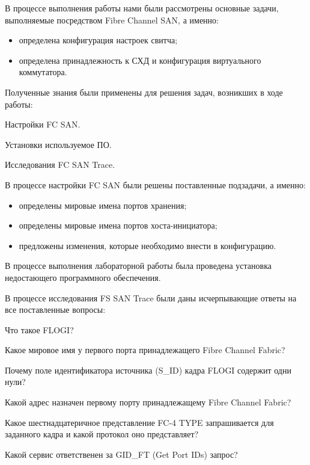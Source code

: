 
В процессе выполнения работы нами были рассмотрены основные задачи, выполняемые
посредством Fibre Channel SAN, а именно:

\begin{itemize}
    \item определена конфигурация настроек свитча;
    \item определена принадлежность к СХД и конфигурация виртуального
          коммутатора.
\end{itemize}

Полученные знания были применены для решения задач, возникших в ходе работы:

\begin{enumerate_num}
    \item Настройки FC SAN.
    \item Установки используемое ПО.
    \item Исследования FC SAN Trace.
\end{enumerate_num}

В процессе настройки FC SAN были решены поставленные подзадачи, а именно:

\begin{itemize}
    \item определены мировые имена портов хранения;
    \item определены мировые имена портов хоста-инициатора;
    \item предложены изменения, которые необходимо внести в конфигурацию.
\end{itemize}

В процессе выполнения лабораторной работы была проведена установка недостающего
программного обеспечения.

В процессе исследования FS SAN Trace были даны исчерпывающие ответы на все
поставленные вопросы:

\begin{enumerate_num}
    \item Что такое FLOGI?
    \item Какое мировое имя у первого порта принадлежащего Fibre Channel
    Fabric?
    \item Почему поле идентификатора источника (S\_ID) кадра FLOGI содержит
    одни нули?
    \item Какой адрес назначен первому порту принадлежащему Fibre Channel
    Fabric?
    \item Какое шестнадцатеричное представление FC-4 TYPE запрашивается для
    заданного кадра и какой протокол оно представляет?
    \item Какой сервис ответственен за GID\_FT (Get Port IDs) запрос?
\end{enumerate_num}
